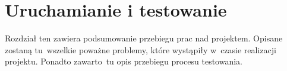 \section{Uruchamianie i testowanie}
Rozdział ten zawiera podsumowanie przebiegu prac nad projektem. Opisane zostaną tu~wszelkie poważne problemy, które wystąpiły w~czasie realizacji projektu. Ponadto zawarto~tu opis przebiegu procesu testowania.

%
%
%
%
